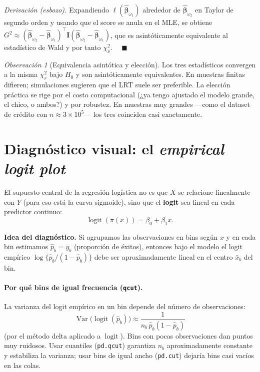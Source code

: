 \documentclass[11pt]{article}
\theoremstyle{plain}
\theoremstyle{definition}
\theoremstyle{remark}
\newtheorem{observacion}[teorema]{Observación}
\newcommand{\Var}{\operatorname{Var}}
\newcommand{\logit}{\operatorname{logit}}
\newcommand{\bI}{\bm{I}}
\newcommand{\hbeta}{\hat{\bm{\beta}}}
\begin{document}
\emph{Derivación (esbozo).} Expandiendo $\ell(\hbeta_{\omega_1})$ alrededor de
$\hbeta_{\omega_2}$ en Taylor de segundo orden y usando que el score se anula en
el MLE, se obtiene
$G^2 \approx (\hbeta_{\omega_2}-\hbeta_{\omega_1})^\top
\bI (\hbeta_{\omega_2}-\hbeta_{\omega_1})$,
que es asintóticamente equivalente al estadístico de Wald y por tanto
$\chi^2_\nu$. $\quad\blacksquare$

\begin{observacion}[Equivalencia asintótica y elección]
Los tres estadísticos convergen a la misma $\chi^2_r$ bajo $H_0$ y son
asintóticamente equivalentes. En muestras finitas difieren; simulaciones
sugieren que el LRT suele ser preferible. La elección práctica se rige por el
costo computacional (¿ya tengo ajustado el modelo grande, el chico, o ambos?) y
por robustez. En muestras muy grandes ---como el dataset de crédito con
$n\approx 3\times10^5$--- los tres coinciden casi exactamente.
\end{observacion}

\section{Diagnóstico visual: el \emph{empirical logit plot}}\label{sec:visual}

El supuesto central de la regresión logística no es que $X$ se relacione
linealmente con $Y$ (para eso está la curva sigmoide), sino que el
\textbf{logit} sea lineal en cada predictor continuo:
\[
  \logit(\pi(x)) = \beta_0 + \beta_1 x .
\]

\textbf{Idea del diagnóstico.} Si agrupamos las observaciones en bins según $x$
y en cada bin estimamos $\hat p_b = \bar y_b$ (proporción de éxitos), entonces
bajo el modelo el logit empírico $\log\{\hat p_b/(1-\hat p_b)\}$ debe ser
aproximadamente lineal en el centro $\bar x_b$ del bin.

\paragraph{Por qué bins de igual frecuencia (\texttt{qcut}).} La varianza del
logit empírico en un bin depende del número de observaciones:
\[
  \Var\big(\logit(\hat p_b)\big) \approx
  \frac{1}{n_b\,\hat p_b(1-\hat p_b)}
\]
(por el método delta aplicado a $\logit$). Bins con pocas observaciones dan
puntos muy ruidosos. Usar cuantiles (\texttt{pd.qcut}) garantiza $n_b$
aproximadamente constante y estabiliza la varianza; usar bins de igual ancho
(\texttt{pd.cut}) dejaría bins casi vacíos en las colas.
\end{document}
